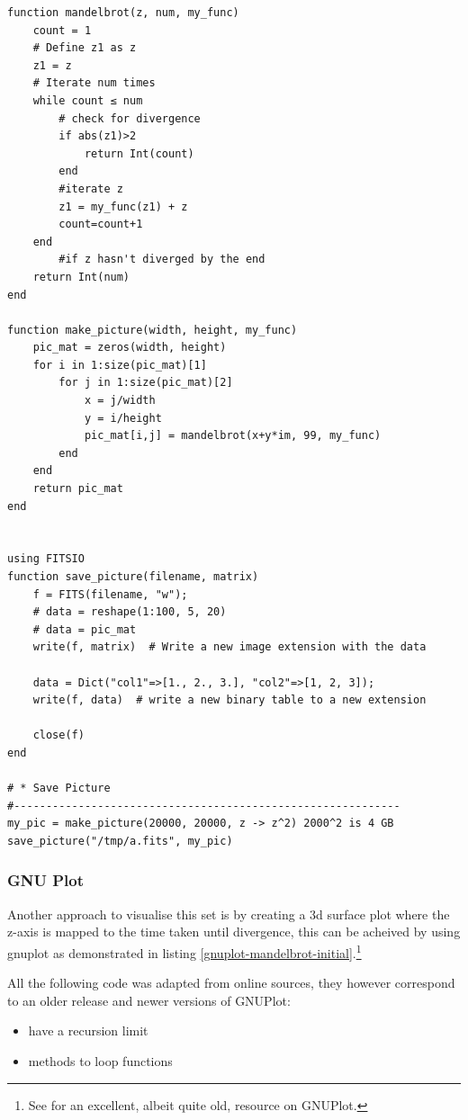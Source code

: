 \documentclass[11pt]{article}
\begin{document}
\begin{verbatim}
function mandelbrot(z, num, my_func)
    count = 1
    # Define z1 as z
    z1 = z
    # Iterate num times
    while count ≤ num
        # check for divergence
        if abs(z1)>2
            return Int(count)
        end
        #iterate z
        z1 = my_func(z1) + z
        count=count+1
    end
        #if z hasn't diverged by the end
    return Int(num)
end

function make_picture(width, height, my_func)
    pic_mat = zeros(width, height)
    for i in 1:size(pic_mat)[1]
        for j in 1:size(pic_mat)[2]
            x = j/width
            y = i/height
            pic_mat[i,j] = mandelbrot(x+y*im, 99, my_func)
        end
    end
    return pic_mat
end


using FITSIO
function save_picture(filename, matrix)
    f = FITS(filename, "w");
    # data = reshape(1:100, 5, 20)
    # data = pic_mat
    write(f, matrix)  # Write a new image extension with the data

    data = Dict("col1"=>[1., 2., 3.], "col2"=>[1, 2, 3]);
    write(f, data)  # write a new binary table to a new extension

    close(f)
end

# * Save Picture
#------------------------------------------------------------
my_pic = make_picture(20000, 20000, z -> z^2) 2000^2 is 4 GB
save_picture("/tmp/a.fits", my_pic)

\end{verbatim}

\subsubsection{GNU Plot}
\label{sec:org74da95e}
Another approach to visualise this set is by creating a 3d surface plot where
the z-axis is mapped to the time taken until divergence, this can be acheived by
using gnuplot as demonstrated in listing \ref{gnuplot-mandelbrot-initial}.\footnote{See \cite{GnuplotFractalMandelbrot} for an excellent, albeit quite old, resource on GNUPlot.}

All the following code was adapted from online sources, they however correspond to an older release
and newer versions of GNUPlot:

\begin{itemize}
\item have a recursion limit
\item methods to loop functions
\end{itemize}
\end{document}
